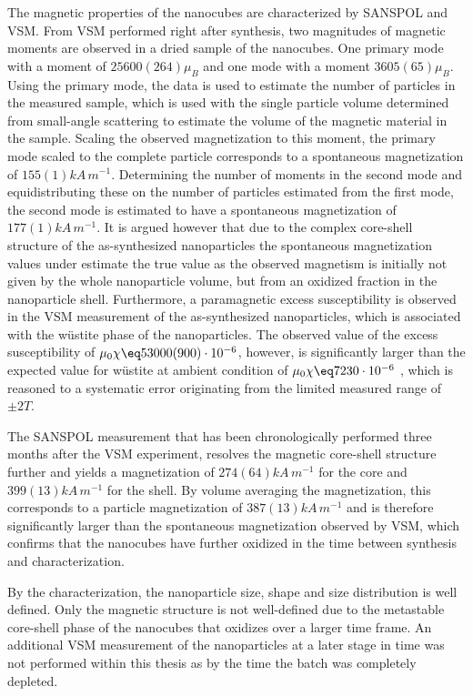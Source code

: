 \documentclass[\main/dresen_thesis.tex]{subfiles}
\begin{document}
  The magnetic properties of the nanocubes are characterized by SANSPOL and VSM.
  From VSM performed right after synthesis, two magnitudes of magnetic moments are observed in a dried sample of the nanocubes.
  One primary mode with a moment of $25600(264) \mu_B$ and one mode with a moment $3605(65) \mu_B$.
  Using the primary mode, the data is used to estimate the number of particles in the measured sample, which is used with the single particle volume determined from small-angle scattering to estimate the volume of the magnetic material in the sample.
  Scaling the observed magnetization to this moment, the primary mode scaled to the complete particle corresponds to a spontaneous magnetization of $155(1) \unit{kA \, m^{-1}}$.
  Determining the number of moments in the second mode and equidistributing these on the number of particles estimated from the first mode, the second mode is estimated to have a spontaneous magnetization of $177(1) \unit{kA \, m^{-1}}$.
  It is argued however that due to the complex core-shell structure of the as-synthesized nanoparticles the spontaneous magnetization values under estimate the true value as the observed magnetism is initially not given by the whole nanoparticle volume, but from an oxidized fraction in the nanoparticle shell.
  Furthermore, a paramagnetic excess susceptibility is observed in the VSM measurement of the as-synthesized nanoparticles, which is associated with the w\"ustite phase of the nanoparticles.
  The observed value of the excess susceptibility of $\mu_0 \chi \eq 53000(900) \cdot 10^{-6}$, however, is significantly larger than the expected value for w\"ustite at ambient condition of $\mu_0 \chi \eq 7230 \cdot 10^{-6}$ \cite{Lide_2004_Handb}, which is reasoned to a systematic error originating from the limited measured range of $\pm 2 \unit{T}$.

  The SANSPOL measurement that has been chronologically performed three months after the VSM experiment, resolves the magnetic core-shell structure further and yields a magnetization of $274(64) \unit{kA \, m^{-1}}$ for the core and $399(13) \unit{kA \, m^{-1}}$ for the shell.
  By volume averaging the magnetization, this corresponds to a particle magnetization of $387(13) \unit{kA \, m^{-1}}$ and is therefore significantly larger than the spontaneous magnetization observed by VSM, which confirms that the nanocubes have further oxidized in the time between synthesis and characterization.

  By the characterization, the nanoparticle size, shape and size distribution is well defined.
  Only the magnetic structure is not well-defined due to the metastable core-shell phase of the nanocubes that oxidizes over a larger time frame.
  An additional VSM measurement of the nanoparticles at a later stage in time was not performed within this thesis as by the time the batch was completely depleted.
\end{document}
